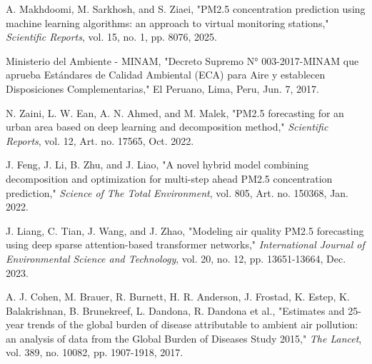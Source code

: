 \documentclass[conference]{IEEEtran}
\begin{document}
\begin{thebibliography}{00}
 A. Makhdoomi, M. Sarkhosh, and S. Ziaei, "PM2.5 concentration prediction using machine learning algorithms: an approach to virtual monitoring stations," \textit{Scientific Reports}, vol. 15, no. 1, pp. 8076, 2025.

 Ministerio del Ambiente - MINAM, "Decreto Supremo N° 003-2017-MINAM que aprueba Estándares de Calidad Ambiental (ECA) para Aire y establecen Disposiciones Complementarias," El Peruano, Lima, Peru, Jun. 7, 2017.

 N. Zaini, L. W. Ean, A. N. Ahmed, and M. Malek, "PM2.5 forecasting for an urban area based on deep learning and decomposition method," \textit{Scientific Reports}, vol. 12, Art. no. 17565, Oct. 2022.

 J. Feng, J. Li, B. Zhu, and J. Liao, "A novel hybrid model combining decomposition and optimization for multi-step ahead PM2.5 concentration prediction," \textit{Science of The Total Environment}, vol. 805, Art. no. 150368, Jan. 2022.

 J. Liang, C. Tian, J. Wang, and J. Zhao, "Modeling air quality PM2.5 forecasting using deep sparse attention-based transformer networks," \textit{International Journal of Environmental Science and Technology}, vol. 20, no. 12, pp. 13651-13664, Dec. 2023.

 A. J. Cohen, M. Brauer, R. Burnett, H. R. Anderson, J. Frostad, K. Estep, K. Balakrishnan, B. Brunekreef, L. Dandona, R. Dandona et al., "Estimates and 25-year trends of the global burden of disease attributable to ambient air pollution: an analysis of data from the Global Burden of Diseases Study 2015," \textit{The Lancet}, vol. 389, no. 10082, pp. 1907-1918, 2017.

\end{thebibliography}
\vspace{12pt}
\end{document}
